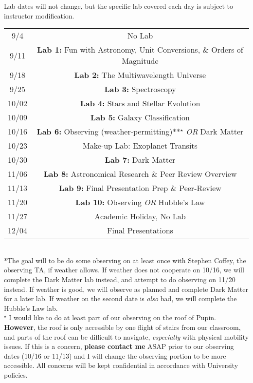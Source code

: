 \documentclass[11pt]{article}
\begin{document}
Lab dates will not change, but the specific lab covered each day is subject to instructor modification. \\

\begin{tabular}{cc}
    9/4 & No Lab \\ 
    9/11 & \textbf{Lab 1:} Fun with Astronomy, Unit Conversions, \& Orders of Magnitude \\ 
    9/18 & \textbf{Lab 2:} The Multiwavelength Universe \\ 
    9/25 & \textbf{Lab 3:} Spectroscopy \\
    10/02 & \textbf{Lab 4:} Stars and Stellar Evolution \\
    10/09 & \textbf{Lab 5:} Galaxy Classification \\ 
    10/16 & \textbf{Lab 6:} Observing (weather-permitting)**$^{\star}$ \textit{OR} Dark Matter \\ 
    10/23 & Make-up Lab: Exoplanet Transits \\ 
    10/30 & \textbf{Lab 7:} Dark Matter \\ 
    11/06 & \textbf{Lab 8:} Astronomical Research \& Peer Review Overview \\
    11/13 & \textbf{Lab 9:}  Final Presentation Prep \& Peer-Review \\
    11/20 & \textbf{Lab 10:} Observing \textit{OR} Hubble's Law\\
    11/27 & Academic Holiday, No Lab \\
    12/04 & Final Presentations  \\ 
\end{tabular} \\

\noindent **The goal will to be do some observing on at least once with Stephen Coffey, the observing TA, if weather allows. If weather does not cooperate on 10/16, we will complete the Dark Matter lab instead, and attempt to do observing on 11/20 instead. If weather is good, we will observe as planned and complete Dark Matter for a later lab. If weather on the second date is \textit{also} bad, we will complete the Hubble's Law lab. \\

\noindent $^{\star}$ I would like to do at least part of our observing on the roof of Pupin. \textbf{However}, the roof is only accessible by one flight of stairs from our classroom, and parts of the roof can be difficult to navigate, \textit{especially} with physical mobility issues. If this is a concern, \textbf{please contact me} ASAP prior to our observing dates (10/16 or 11/13) and I will change the observing portion to be more accessible. All concerns will be kept confidential in accordance with University policies.
\end{document}
